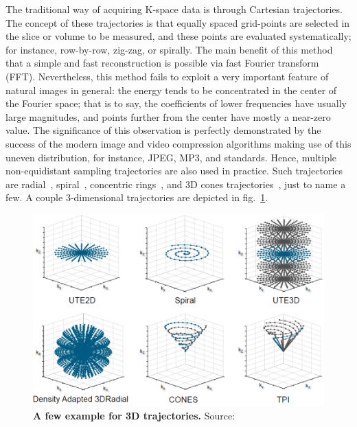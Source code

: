 The traditional way of acquiring K-space data is through Cartesian trajectories. The concept of these trajectories is that equally spaced grid-points are selected in the slice or volume to be measured, and these points are evaluated systematically; for instance, row-by-row, zig-zag, or spirally. The main benefit of this method that a simple and fast reconstruction is possible via fast Fourier transform (FFT). Nevertheless, this method fails to exploit a very important feature of natural images in general: the energy tends to be concentrated in the center of the Fourier space; that is to say, the coefficients of lower frequencies have usually large magnitudes, and points further from the center have mostly a near-zero value. The significance of this observation is perfectly demonstrated by the success of the modern image and video compression algorithms making use of this uneven distribution, for instance, JPEG, MP3, and standards. Hence, multiple non-equidistant sampling trajectories are also used in practice. Such trajectories are radial~\cite{rasche_continuous_1995}, spiral~\cite{blum_fast_1987}, concentric rings~\cite{wu_mri_2008}, and 3D cones trajectories~\cite{gurney_design_2006}, just to name a few. A couple 3-dimensional trajectories are depicted in fig.~\ref{fig:trajectories}.

\begin{figure}[tb]
    \centering
    \includegraphics[width=0.8\linewidth]{images/trajectories.png}
    \caption{\textbf{A few example for 3D trajectories.} Source:~\cite{noauthor_forschungszentrum_nodate}}
    \label{fig:trajectories}
\end{figure}

